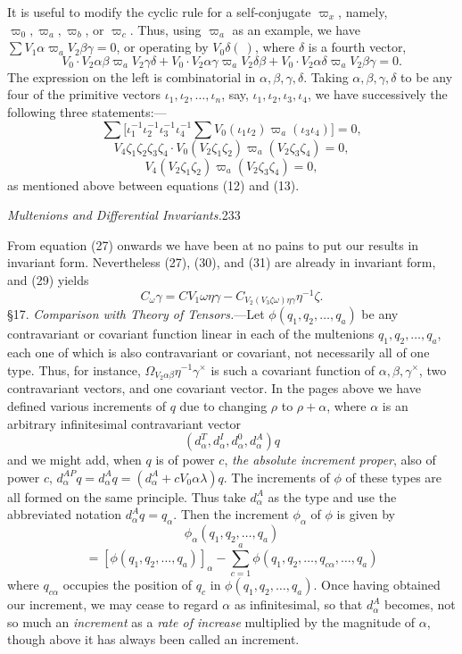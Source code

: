 \documentclass[11pt]{article}
\begin{document}
\indent It is useful to modify the cyclic rule for a self-conjugate $\varpi_x$, namely, $\varpi_0,\varpi_a,\varpi_b$, or $\varpi_c$. Thus, using $\varpi_a$ as an example, we have $\sum V_1\alpha\varpi_aV_2\beta\gamma=0$, or operating by $V_0\delta(\ )$, where $\delta$ is a fourth vector,
\[
V_0\mathbin{\cdot}V_2\alpha\beta\varpi_aV_2\gamma\delta+V_0\mathbin{\cdot}V_2\alpha\gamma\varpi_aV_2\delta\beta+V_0\mathbin{\cdot}V_2\alpha\delta\varpi_aV_2\beta\gamma=0.
\]
The expression on the left is combinatorial in $\alpha,\beta,\gamma,\delta$. Taking $\alpha,\beta,\gamma,\delta$ to be any four of the primitive vectors $\iota_1,\iota_2,\ldots,\iota_n$, say, $\iota_1,\iota_2,\iota_3,\iota_4$, we have successively the following three statements:---
\[
\sum\bigl[\iota_1^{-1}\iota_2^{-1}\iota_3^{-1}\iota_4^{-1}\sum V_0(\iota_1\iota_2)\varpi_a(\iota_3\iota_4)\bigr]=0,
\]
\[
V_4\zeta_1\zeta_2\zeta_3\zeta_4\mathbin{\cdot}V_0(V_2\zeta_1\zeta_2)\varpi_a(V_2\zeta_3\zeta_4)=0,
\]
\begin{equation}V_4(V_2\zeta_1\zeta_2)\varpi_a(V_2\zeta_3\zeta_4)=0,\tag{31}\end{equation}
as mentioned above between equations (12) and (13).
\newpage\thispagestyle{empty}\begin{center}\textit{Multenions and Differential Invariants.}\hfill 233\end{center}
From equation (27) onwards we have been at no pains to put our results in invariant form. Nevertheless (27), (30), and (31) are already in invariant form, and (29) yields
\begin{equation}C_\omega\gamma=CV_1\omega\eta\gamma-C_{V_2(V_3\zeta\omega)\eta\gamma}\eta^{-1}\zeta.\tag{29a}\end{equation}
\indent \S17. \emph{Comparison with Theory of Tensors.}---Let $\phi(q_1,q_2,\ldots,q_a)$ be any contravariant or covariant function linear in each of the multenions $q_1,q_2,\ldots,q_a$, each one of which is also contravariant or covariant, not necessarily all of one type. Thus, for instance, $\Omega_{V_2\alpha\beta}\eta^{-1}\gamma^\times$ is such a covariant function of $\alpha,\beta,\gamma^\times$, two contravariant vectors, and one covariant vector. In the pages above we have defined various increments of $q$ due to changing $\rho$ to $\rho+\alpha$, where $\alpha$ is an arbitrary infinitesimal contravariant vector
\[
(d_\alpha^T,d_\alpha^I,d_\alpha^0,d_\alpha^A)q
\]
and we might add, when $q$ is of power $c$, \emph{the absolute increment proper}, also of power $c$, $d_\alpha^{AP}q=d_\alpha^Aq=(d_\alpha^A+cV_0\alpha\lambda)q$. The increments of $\phi$ of these types are all formed on the same principle. Thus take $d_\alpha^A$ as the type and use the abbreviated notation $d_\alpha^Aq=q_\alpha$. Then the increment $\phi_\alpha$ of $\phi$ is given by
\[
\phi_\alpha(q_1,q_2,\ldots,q_a)
\]
\[
=[\phi(q_1,q_2,\ldots,q_a)]_\alpha-\sum_{c=1}^a\phi(q_1,q_2,\ldots,q_{c\alpha},\ldots,q_a)
\]
where $q_{c\alpha}$ occupies the position of $q_c$ in $\phi(q_1,q_2,\ldots,q_a)$. Once having obtained our increment, we may cease to regard $\alpha$ as infinitesimal, so that $d_\alpha^A$ becomes, not so much an \emph{increment} as a \emph{rate of increase} multiplied by the magnitude of $\alpha$, though above it has always been called an increment.
\end{document}
